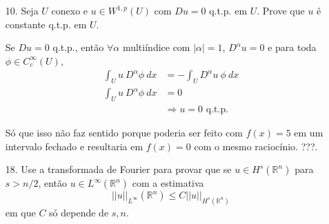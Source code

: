 \documentclass[11pt]{article}
\newcommand{\Rn}{{\mathbb{R}^n}}
\begin{document}
\begin{enumerate}
	\item[10.]\label{ex:U-conexo_u-constante} Seja $U$ conexo e $u \in W^{1,p}(U)$ com $Du=0$ q.t.p. em $U$. Prove que $u$ é constante q.t.p. em $U$.
	
	Se $Du=0$ q.t.p., então $\forall\alpha$ multiíndice com $|\alpha|=1$, $D^\alpha u =0$ e para toda $\phi\in C^\infty_c(U)$,\begin{align*}
		\int_U u\ D^\alpha \phi\ dx &= - \int_U D^\alpha u \ \phi \ dx \\
		\int_U u\ D^\alpha \phi\ dx &= 0\\
		&\Rightarrow u =0 \text{ q.t.p. }
	\end{align*}

	Só que isso não faz sentido porque poderia ser feito com $f(x)=5$ em um intervalo fechado e resultaria em $f(x)=0$ com o mesmo raciocínio. ???.

	\item[18.] Use a transformada de Fourier para provar que se $u \in H^s(\Rn)$ para $s> n/2$, então $u \in L^{\infty}(\Rn)$ com a estimativa \[ ||u||_{L^\infty}(\Rn) \leq C ||u||_{H^s(\Rn)} \] em que $C$ só depende de $s,n$.
\end{enumerate}
\end{document}
